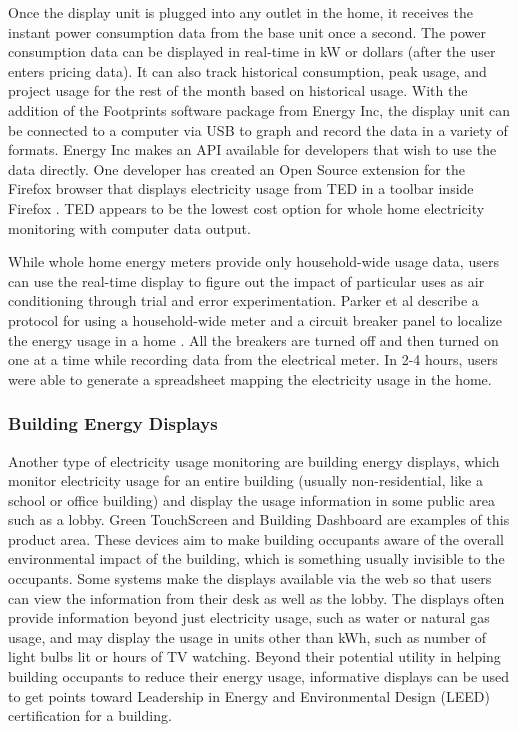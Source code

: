 Once the display unit is plugged into any outlet in the home, it receives the instant power consumption data from the base unit once a second. The power consumption data can be displayed in real-time in kW or dollars (after the user enters pricing data). It can also track historical consumption, peak usage, and project usage for the rest of the month based on historical usage. With the addition of the Footprints software package from Energy Inc, the display unit can be connected to a computer via USB to graph and record the data in a variety of formats. Energy Inc makes an API available for developers that wish to use the data directly. One developer has created an Open Source extension for the Firefox browser that displays electricity usage from TED in a toolbar inside Firefox \cite{Nick2008TED-the-Toolbar}. TED appears to be the lowest cost option for whole home electricity monitoring with computer data output.

While whole home energy meters provide only household-wide usage data, users can use the real-time display to figure out the impact of particular uses as air conditioning through trial and error experimentation. Parker et al describe a protocol for using a household-wide meter and a circuit breaker panel to localize the energy usage in a home \cite{Parker2006How-Much-Energy}. All the breakers are turned off and then turned on one at a time while recording data from the electrical meter. In 2-4 hours, users were able to generate a spreadsheet mapping the electricity usage in the home.

\subsubsection{Building Energy Displays}

Another type of electricity usage monitoring are building energy displays, which monitor electricity usage for an entire building (usually non-residential, like a school or office building) and display the usage information in some public area such as a lobby. Green TouchScreen \cite{greentouchscreen} and Building Dashboard \cite{building-dashboard} are examples of this product area. These devices aim to make building occupants aware of the overall environmental impact of the building, which is something usually invisible to the occupants. Some systems make the displays available via the web so that users can view the information from their desk as well as the lobby. The displays often provide  information beyond just electricity usage, such as water or natural gas usage, and may display the usage in units other than kWh, such as number of light bulbs lit or hours of TV watching. Beyond their potential utility in helping building occupants to reduce their energy usage, informative displays can be used to get points toward Leadership in Energy and Environmental Design (LEED) certification for a building.

